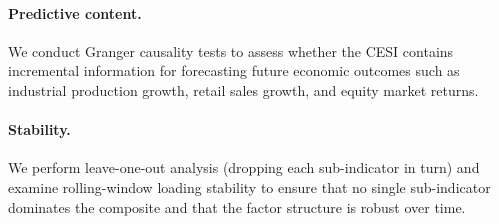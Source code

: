 \documentclass[11pt]{article}
\begin{document}
\paragraph{Predictive content.}  We conduct Granger causality tests
to assess whether the CESI contains incremental information for
forecasting future economic outcomes such as industrial production
growth, retail sales growth, and equity market returns.

\paragraph{Stability.}  We perform leave-one-out analysis (dropping
each sub-indicator in turn) and examine rolling-window loading
stability to ensure that no single sub-indicator dominates the
composite and that the factor structure is robust over time.



\end{document}
